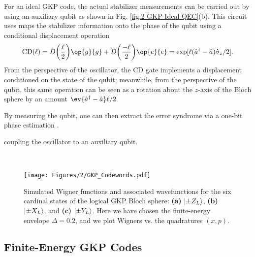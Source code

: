 For an ideal GKP code, the actual stabilizer measurements can be carried out by using an auxiliary qubit as shown in Fig. \ref{fig:2-GKP-Ideal-QEC}(b). This circuit uses maps the stabilizer information onto the phase of the qubit using a conditional displacement operation
\begin{equation}
    {\rm CD}(\ell) = \hat{D}\bigg(\frac{\ell}{2}\bigg)\op{g}{g} + \hat{D}\bigg(\frac{-\ell}{2}\bigg)\op{e}{e} = \exp[\ell(\hat{a}^\dagger - \hat{a}) \sigmaz / 2].
    \label{eq:2_CD_unitary_definition}
\end{equation}
From the perspective of the oscillator, the CD gate implements a displacement conditioned on the state of the qubit; meanwhile, from the perspective of the qubit, this same operation can be seen as a rotation about the $z$-axis of the Bloch sphere by an amount $\ev{\hat{a}^\dagger - \hat{a}}\ell/2$



By measuring the qubit, one can then extract the error syndrome via a one-bit phase estimation \cite{terhal2016phase-estimation}. 


coupling the oscillator to an auxiliary qubit. 





$ $


\begin{figure}
    \centering
    \texttt{[image: Figures/2/GKP\_Codewords.pdf]}
    \caption{Simulated Wigner functions and associated wavefunctions for the six cardinal states of the logical GKP Bloch sphere: \textbf{(a)} $\lvert\pm Z_L\rangle$, \textbf{(b)} $\lvert\pm X_L\rangle$, and \textbf{(c)} $\lvert\pm Y_L\rangle$. Here we have chosen the finite-energy envelope $\Delta = 0.2$, and we plot Wigners vs. the quadratures $(x, p)$.}
    \label{fig:2_GKP_Codewords}
\end{figure}
\clearpage

\subsection{Finite-Energy GKP Codes}

